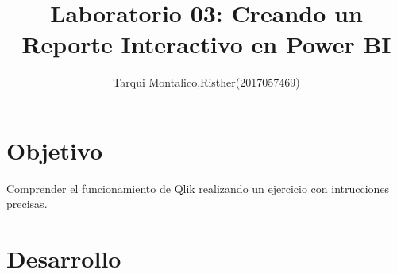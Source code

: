 \documentclass[preprint,12pt]{elsarticle}
\begin{document}
	
	\begin{frontmatter}

		\title{\huge  Laboratorio 03: Creando un Reporte Interactivo en Power BI	 }
		\author{	Tarqui Montalico,Risther(2017057469)}
		
		





\end{frontmatter}

\section{Objetivo}
	
	Comprender el funcionamiento de Qlik realizando un ejercicio con intrucciones precisas.


\section{Desarrollo}
\end{document}
